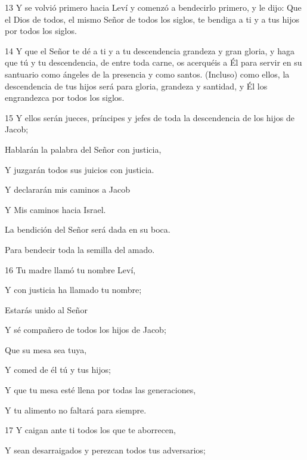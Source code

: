 \par 13 Y se volvió primero hacia Leví y comenzó a bendecirlo primero, y le dijo: Que el Dios de todos, el mismo Señor de todos los siglos, te bendiga a ti y a tus hijos por todos los siglos.
\par 14 Y que el Señor te dé a ti y a tu descendencia grandeza y gran gloria, y haga que tú y tu descendencia, de entre toda carne, os acerquéis a Él para servir en su santuario como ángeles de la presencia y como santos. (Incluso) como ellos, la descendencia de tus hijos será para gloria, grandeza y santidad, y Él los engrandezca por todos los siglos.
\par 15 Y ellos serán jueces, príncipes y jefes de toda la descendencia de los hijos de Jacob;
\par    
\par     Hablarán la palabra del Señor con justicia,  
\par     Y juzgarán todos sus juicios con justicia.
\par    
\par     Y declararán mis caminos a Jacob  
\par     Y Mis caminos hacia Israel.
\par    
\par     La bendición del Señor será dada en su boca.  
\par     Para bendecir toda la semilla del amado.
\par    
\par 16 Tu madre llamó tu nombre Leví,  
\par     Y con justicia ha llamado tu nombre;
\par    
\par     Estarás unido al Señor  
\par     Y sé compañero de todos los hijos de Jacob;
\par    
\par     Que su mesa sea tuya,  
\par     Y comed de él tú y tus hijos;
\par    
\par     Y que tu mesa esté llena por todas las generaciones,  
\par     Y tu alimento no faltará para siempre.
\par    
\par 17 Y caigan ante ti todos los que te aborrecen,  
\par     Y sean desarraigados y perezcan todos tus adversarios;
\par    

